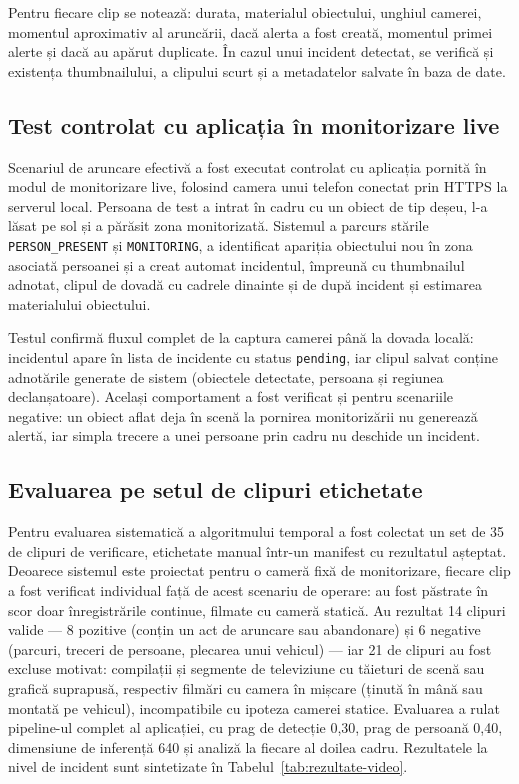 Pentru fiecare clip se notează: durata, materialul obiectului, unghiul camerei, momentul aproximativ al aruncării, dacă alerta a fost creată, momentul primei alerte și dacă au apărut duplicate. În cazul unui incident detectat, se verifică și existența thumbnailului, a clipului scurt și a metadatelor salvate în baza de date.

\subsection{Test controlat cu aplicația în monitorizare live}

Scenariul de aruncare efectivă a fost executat controlat cu aplicația pornită în modul de monitorizare live, folosind camera unui telefon conectat prin HTTPS la serverul local. Persoana de test a intrat în cadru cu un obiect de tip deșeu, l-a lăsat pe sol și a părăsit zona monitorizată. Sistemul a parcurs stările \texttt{PERSON\_PRESENT} și \texttt{MONITORING}, a identificat apariția obiectului nou în zona asociată persoanei și a creat automat incidentul, împreună cu thumbnailul adnotat, clipul de dovadă cu cadrele dinainte și de după incident și estimarea materialului obiectului.

Testul confirmă fluxul complet de la captura camerei până la dovada locală: incidentul apare în lista de incidente cu status \texttt{pending}, iar clipul salvat conține adnotările generate de sistem (obiectele detectate, persoana și regiunea declanșatoare). Același comportament a fost verificat și pentru scenariile negative: un obiect aflat deja în scenă la pornirea monitorizării nu generează alertă, iar simpla trecere a unei persoane prin cadru nu deschide un incident.

\subsection{Evaluarea pe setul de clipuri etichetate}

Pentru evaluarea sistematică a algoritmului temporal a fost colectat un set de 35 de clipuri de verificare, etichetate manual într-un manifest cu rezultatul așteptat. Deoarece sistemul este proiectat pentru o cameră fixă de monitorizare, fiecare clip a fost verificat individual față de acest scenariu de operare: au fost păstrate în scor doar înregistrările continue, filmate cu cameră statică. Au rezultat 14 clipuri valide --- 8 pozitive (conțin un act de aruncare sau abandonare) și 6 negative (parcuri, treceri de persoane, plecarea unui vehicul) --- iar 21 de clipuri au fost excluse motivat: compilații și segmente de televiziune cu tăieturi de scenă sau grafică suprapusă, respectiv filmări cu camera în mișcare (ținută în mână sau montată pe vehicul), incompatibile cu ipoteza camerei statice. Evaluarea a rulat pipeline-ul complet al aplicației, cu prag de detecție 0,30, prag de persoană 0,40, dimensiune de inferență 640 și analiză la fiecare al doilea cadru. Rezultatele la nivel de incident sunt sintetizate în Tabelul~\ref{tab:rezultate-video}.

